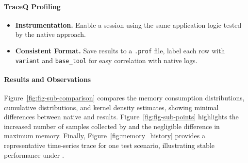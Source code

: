 \paragraph{TraceQ Profiling}
\begin{itemize}

    \item \textbf{Instrumentation.} Enable a \traceq session using the same application logic tested by the native approach.

    \item \textbf{Consistent Format.} Save \traceq results to a \texttt{.prof} file, label each row with \texttt{variant} and \texttt{base\_tool} for easy correlation with native logs.

\end{itemize}

\paragraph{Results and Observations}
Figure~\ref{fig:fig-sub-comparison} compares the memory consumption distributions, cumulative distributions, and kernel density estimates, showing minimal differences between native and \traceq results.
Figure~\ref{fig:fig-sub-points} highlights the increased number of samples collected by \traceq and the negligible difference in maximum memory.
Finally, Figure~\ref{fig:memory_history} provides a representative time‑series trace for one test scenario, illustrating stable performance under \traceq.

